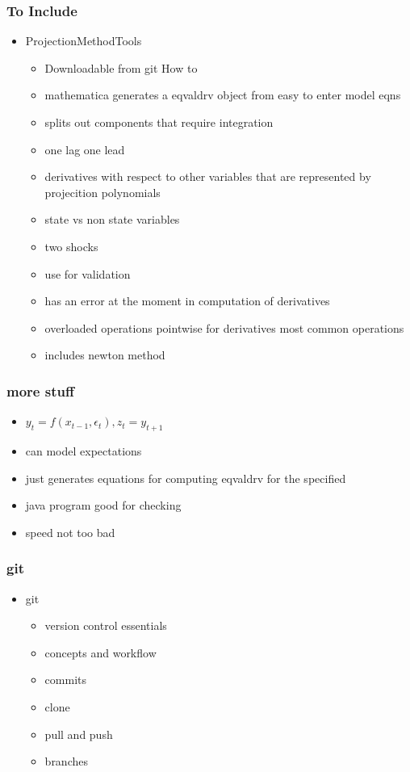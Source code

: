 \documentclass[handout]{beamer}
\begin{document}
\begin{frame}
  \frametitle{To Include}
  \begin{itemize}
  \item ProjectionMethodTools
    \begin{itemize}
    \item Downloadable from git  How to
    \item mathematica generates a eqvaldrv object from easy to enter model eqns
    \item splits out components that require integration
    \item one lag one lead
    \item derivatives with respect to other variables that are represented by projecition polynomials
    \item state vs non state variables
    \item two shocks
    \item use for validation
    \item has an error at the moment in computation of derivatives
    \item overloaded operations pointwise for derivatives most common operations
    \item includes newton method
    \end{itemize}

  \end{itemize}
\end{frame}

\begin{frame}
  \frametitle{more stuff}
  \begin{itemize}
\item $y_{t}=f(x_{t-1},\epsilon_t),z_t=y_{t+1}$
  \item can model expectations
  \item just generates equations for computing eqvaldrv for the specified
  \item java program good for checking
  \item speed not too bad
  \end{itemize}
\end{frame}



\begin{frame}
  \frametitle{git}
  \begin{itemize}
  \item git
    \begin{itemize}
    \item version control essentials
    \item concepts and workflow
    \item commits
    \item clone
    \item pull and push
    \item branches
    \end{itemize}
  \end{itemize}
\end{frame}
\end{document}
